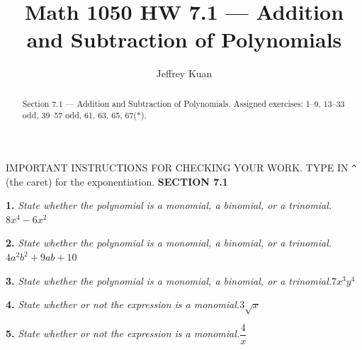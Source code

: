 \documentclass{ximera}
\author{Jeffrey Kuan}
\title{Math 1050 HW 7.1 --- Addition and Subtraction of Polynomials}
\begin{document}
\begin{abstract}
    Section 7.1 --- Addition and Subtraction of Polynomials.
    Assigned exercises: 1–9, 13–33 odd, 39–57 odd, 61, 63, 65, 67(*).
\end{abstract}

\maketitle

IMPORTANT INSTRUCTIONS FOR CHECKING YOUR WORK. TYPE IN \texttt{\^{}} (the caret) for the exponentiation. \textbf{SECTION 7.1}

\begin{problem}
\textbf{1.} \emph{State whether the polynomial is a monomial, a binomial, or a trinomial.}\quad $8x^4 - 6x^2$

\begin{multipleChoice} 
\end{multipleChoice}
\end{problem}

\begin{problem}
\textbf{2.} \emph{State whether the polynomial is a monomial, a binomial, or a trinomial.}\quad $4a^2b^2 + 9ab + 10$

\begin{multipleChoice}
\end{multipleChoice}
\end{problem}

\begin{problem}
\textbf{3.} \emph{State whether the polynomial is a monomial, a binomial, or a trinomial.}\quad $7x^3y^4$

\begin{multipleChoice} 
\end{multipleChoice}
\end{problem}

\begin{problem}
\textbf{4.} \emph{State whether or not the expression is a monomial.}\quad $3\sqrt{x}$

\begin{multipleChoice}
\end{multipleChoice}
\end{problem}

\begin{problem}
\textbf{5.} \emph{State whether or not the expression is a monomial.}\quad $\dfrac{4}{x}$

\begin{multipleChoice} 
\end{multipleChoice}
\end{problem}
\end{document}
